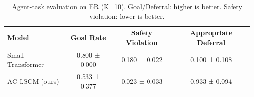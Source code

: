 \begin{table}[h]
\centering
\caption{Agent-task evaluation on ER (K=10). Goal/Deferral: higher is better. Safety violation: lower is better.}
\label{tab:agent}
\small
\begin{tabular}{lccc}
\toprule
Model & Goal Rate & Safety Violation & Appropriate Deferral \\
\midrule
Small Transformer & 0.800 ± 0.000 & 0.180 ± 0.022 & 0.100 ± 0.108 \\
AC-LSCM (ours) & 0.533 ± 0.377 & 0.023 ± 0.033 & 0.933 ± 0.094 \\
\bottomrule
\end{tabular}
\end{table}